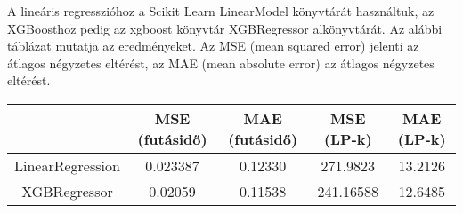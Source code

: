 \documentclass[12pt]{article}
\theoremstyle{plain}%
\theoremstyle{definition}%
\begin{document}
A lineáris regresszióhoz a Scikit Learn LinearModel könyvtárát használtuk, az XGBoosthoz pedig az xgboost könyvtár XGBRegressor alkönyvtárát. Az alábbi táblázat mutatja az eredményeket. Az MSE (mean squared error) jelenti az átlagos négyzetes eltérést, az MAE (mean absolute error) az átlagos négyzetes eltérést.\\
\begin{center}
\begin{tabular}{|c|c|c|c|c|}
\hline 
 & MSE (futásidő) & MAE (futásidő) & MSE (LP-k) & MAE (LP-k)\\
 \hline
 \hline 
 LinearRegression & 0.023387 &  0.12330 & 271.9823 &13.2126 \\
 \hline 
 XGBRegressor & 0.02059 & 0.11538 & 241.16588 & 12.6485 \\
 \hline
\end{tabular}
\end{center}
\end{document}
